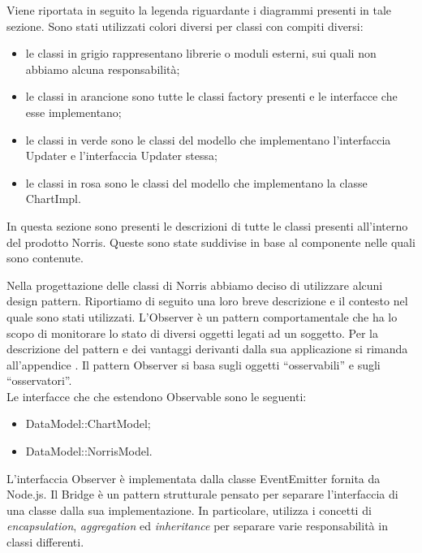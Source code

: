 		Viene riportata in seguito la legenda riguardante i diagrammi presenti in tale sezione. Sono stati utilizzati colori diversi per classi con compiti diversi:
		\begin{itemize}
			\item le classi in grigio rappresentano librerie o moduli esterni, sui quali non abbiamo alcuna responsabilità;
			\item le classi in arancione sono tutte le classi factory presenti e le interfacce che esse implementano;
			\item le classi in verde sono le classi del modello che implementano l'interfaccia Updater e l'interfaccia Updater stessa;
			\item le classi in rosa sono le classi del modello che implementano la classe ChartImpl.
		\end{itemize}
		In questa sezione sono presenti le descrizioni di tutte le classi presenti all'interno del prodotto Norris. Queste sono state suddivise in base al componente nelle quali sono contenute.
		
		
		
			Nella progettazione delle classi di Norris abbiamo deciso di utilizzare alcuni design pattern. Riportiamo di seguito una loro breve descrizione e il contesto nel quale sono stati utilizzati.
			L'Observer è un pattern comportamentale che ha lo scopo di monitorare lo stato di diversi oggetti legati ad un soggetto.
			Per la descrizione del pattern e dei vantaggi derivanti dalla sua applicazione si rimanda all'appendice .
				Il pattern Observer si basa sugli oggetti “osservabili” e sugli “osservatori”.\\
				Le interfacce che che estendono Observable sono le seguenti:
				\begin{itemize}
					\item DataModel::ChartModel;
					\item DataModel::NorrisModel.
				\end{itemize}
				L'interfaccia Observer è implementata dalla classe EventEmitter fornita da Node.js.
			Il Bridge è un pattern strutturale pensato per separare l'interfaccia di una classe dalla sua implementazione. In particolare, utilizza i concetti di \textit{encapsulation}, \textit{aggregation} ed \textit{inheritance} per separare varie responsabilità in classi differenti. \\
